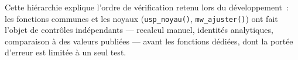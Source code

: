 \documentclass[a4paper,11pt]{article}
\newcommand{\code}[1]{\texttt{\small #1}}
\begin{document}
\noindent
Cette hiérarchie explique l'ordre de vérification retenu lors du développement~:
les fonctions communes et les noyaux (\code{usp\_noyau()}, \code{mw\_ajuster()})
ont fait l'objet de contrôles indépendants --- recalcul manuel, identités
analytiques, comparaison à des valeurs publiées --- avant les fonctions dédiées,
dont la portée d'erreur est limitée à un seul test.
\end{document}
